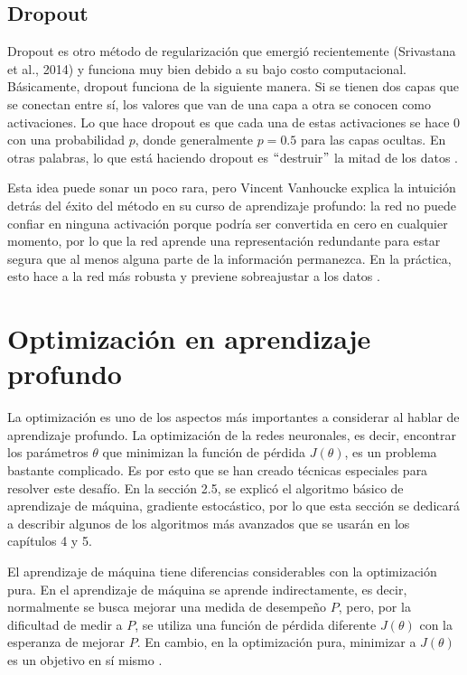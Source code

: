 \subsection{Dropout}
Dropout es otro método de regularización que emergió recientemente (Srivastana et al., 2014) y funciona muy bien debido a su bajo costo computacional. Básicamente, dropout funciona de la siguiente manera. Si se tienen dos capas que se conectan entre sí, los valores que van de una capa a otra se conocen como activaciones. Lo que hace dropout es que cada una de estas activaciones se hace 0 con una probabilidad $p$, donde generalmente $p=0.5$ para las capas ocultas. En otras palabras, lo que está haciendo dropout es $``$destruir$"$ la mitad de los datos \cite{goodfellow-et-al-2016} \cite{Srivastava:2014:DSW:2627435.2670313} \cite{deeplearningbygoogle}.

\vspace{1em}

Esta idea puede sonar un poco rara, pero Vincent Vanhoucke explica la intuición detrás del éxito del método en su curso de aprendizaje profundo: la red no puede confiar en ninguna activación porque podría ser convertida en cero en cualquier momento, por lo que la red aprende una representación redundante para estar segura que al menos alguna parte de la información permanezca. En la práctica, esto hace a la red más robusta y previene sobreajustar a los datos \cite{goodfellow-et-al-2016} \cite{deeplearningbygoogle}.

\section{Optimización en aprendizaje profundo}
La optimización es uno de los aspectos más importantes a considerar al hablar de aprendizaje profundo. La optimización de la redes neuronales, es decir, encontrar los parámetros $\theta$ que minimizan la función de pérdida $J(\theta)$, es un problema bastante complicado. Es por esto que se han creado técnicas especiales para resolver este desafío. En la sección 2.5, se explicó el algoritmo básico de aprendizaje de máquina, gradiente estocástico, por lo que esta sección se dedicará a describir algunos de los algoritmos más avanzados que se usarán en los capítulos 4 y 5.

\vspace{1em}

El aprendizaje de máquina tiene diferencias considerables con la optimización pura. En el aprendizaje de máquina se aprende indirectamente, es decir, normalmente se busca mejorar una medida de desempeño $P$, pero, por la dificultad de medir a $P$, se utiliza una función de pérdida diferente $J(\theta)$ con la esperanza de mejorar $P$. En cambio, en la optimización pura, minimizar a $J(\theta)$ es un objetivo en sí mismo \cite{goodfellow-et-al-2016}.

